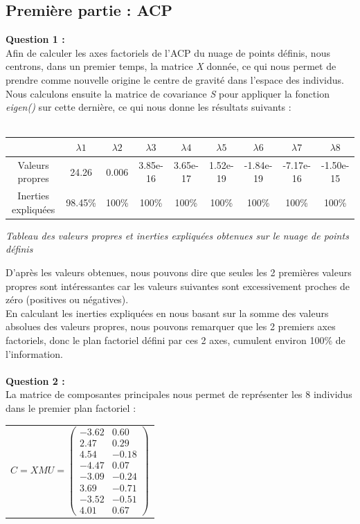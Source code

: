 \documentclass[a4paper, 10pt]{article}
\begin{document}
\subsection*{Première partie : ACP}
\textbf{Question 1 :}\\
Afin de calculer les axes factoriels de l'ACP du nuage de points définis, nous centrons, dans un premier temps, la matrice \textit{X} donnée,
ce qui nous permet de prendre comme nouvelle origine le centre de gravité dans l'espace des individus.\\
Nous calculons ensuite la matrice de covariance \textit{S} pour appliquer la fonction \textit{eigen()} sur cette dernière,
ce qui nous donne les résultats suivants :\\ \\
\begin{tabular}{|c|c|c|c|c|c|c|c|c|}
\hline
 & $\lambda1$ & $\lambda2$ & $\lambda3$ & $\lambda4$ & $\lambda5$ & $\lambda6$ & $\lambda7$ & $\lambda8$ \\
\hline
Valeurs propres & 24.26 & 0.006 & 3.85e-16 & 3.65e-17 & 1.52e-19 & -1.84e-19 & -7.17e-16 & -1.50e-15 \\
\hline
Inerties expliquées & 98.45\% & 100\% & 100\% & 100\% & 100\% & 100\% & 100\% & 100\% \\
\hline
\end{tabular}
\begin{center}
\textit{Tableau des valeurs propres et inerties expliquées obtenues sur le nuage de points définis}
\end{center}
D'après les valeurs obtenues, nous pouvons dire que seules les 2 premières valeurs propres sont intéressantes car les valeurs suivantes sont excessivement proches de zéro (positives ou négatives). \\En calculant les inerties expliquées en nous basant sur la somme des valeurs absolues des valeurs propres, nous pouvons remarquer que les 2 premiers axes factoriels, donc le plan factoriel défini par ces 2 axes,
cumulent environ 100\% de l'information.\\ \\
\textbf{Question 2 :}\\
La matrice de composantes principales nous permet de représenter les 8 individus dans le premier plan factoriel :\\
\hspace*{0.5cm}
\begin{tabular}{c}
$C = XMU =
\begin{pmatrix}
-3.62 & 0.60 \\
2.47 & 0.29 \\
4.54 & -0.18 \\
-4.47 & 0.07 \\
-3.09 & -0.24 \\
3.69 & -0.71 \\
-3.52 & -0.51 \\
4.01 & 0.67
\end{pmatrix}$\\
\end{tabular}
\end{document}
